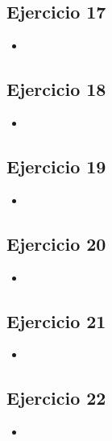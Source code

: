 \documentclass[10pt,a4paper]{article}
\begin{document}
\subsection{Ejercicio 17}
\begin{itemize}
\item
\end{itemize}

\subsection{Ejercicio 18}
\begin{itemize}
\item
\end{itemize}

\subsection{Ejercicio 19}
\begin{itemize}
\item
\end{itemize}


\subsection{Ejercicio 20}
\begin{itemize}
\item
\end{itemize}

\subsection{Ejercicio 21}
\begin{itemize}
\item
\end{itemize}

\subsection{Ejercicio 22}
\begin{itemize}
\item
\end{itemize}
\end{document}
